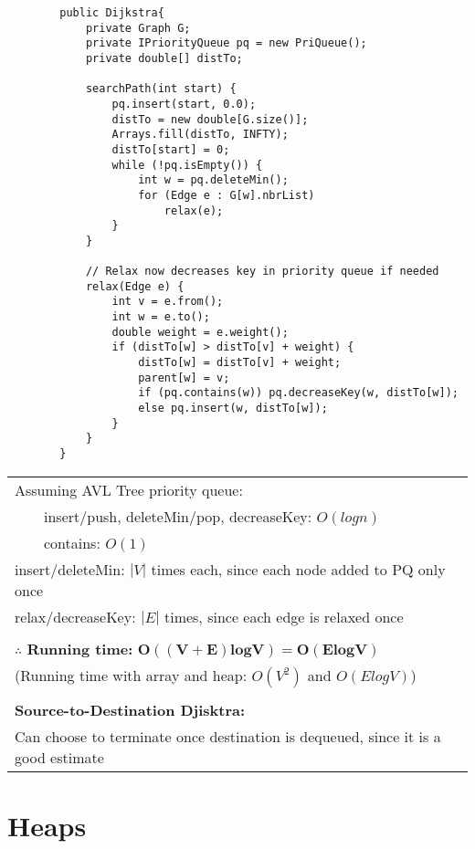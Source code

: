 \documentclass{article}
\newcommand{\tabitem}{~~\llap{\textbullet}~~}
\begin{document}
    \begin{verbatim}
        public Dijkstra{
            private Graph G;
            private IPriorityQueue pq = new PriQueue();
            private double[] distTo;

            searchPath(int start) {
                pq.insert(start, 0.0);
                distTo = new double[G.size()];
                Arrays.fill(distTo, INFTY);
                distTo[start] = 0;
                while (!pq.isEmpty()) {
                    int w = pq.deleteMin();
                    for (Edge e : G[w].nbrList)
                        relax(e);
                }
            }

            // Relax now decreases key in priority queue if needed
            relax(Edge e) {
                int v = e.from();
                int w = e.to();
                double weight = e.weight();
                if (distTo[w] > distTo[v] + weight) {
                    distTo[w] = distTo[v] + weight;
                    parent[w] = v;
                    if (pq.contains(w)) pq.decreaseKey(w, distTo[w]);
                    else pq.insert(w, distTo[w]);
                }
            }
        }
    \end{verbatim}
        
    \begin{tabular}{l}
        Assuming AVL Tree priority queue:\\
        \tabitem insert/push, deleteMin/pop, decreaseKey: $O(logn)$\\
        \tabitem contains: $O(1)$\\
        insert/deleteMin: $|V|$ times each, since each node added to PQ only once\\
        relax/decreaseKey: $|E|$ times, since each edge is relaxed once\\\\
        $\therefore$\textbf{ Running time: }$\bm{O((V+E)logV) = O(ElogV)}$\\
        (Running time with array and heap: $O(V^{2})$ and $O(ElogV)$)\\\\
        \textbf{Source-to-Destination Djisktra: }\\
        Can choose to terminate once destination is dequeued, since it is a good estimate\\
    \end{tabular}

    \section{Heaps}
\end{document}
